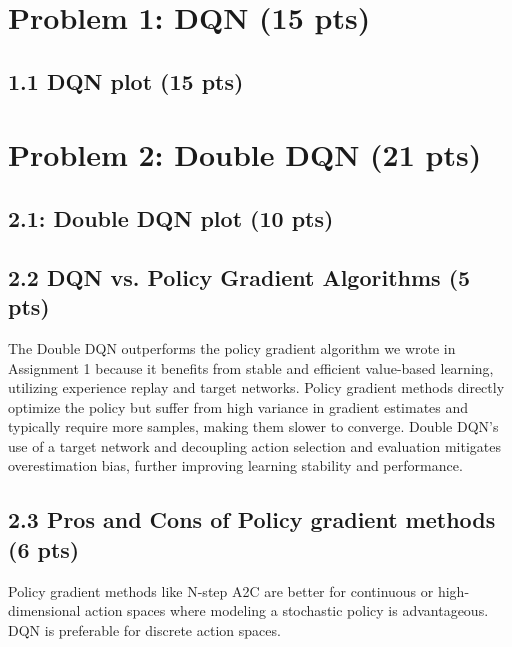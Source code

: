 \documentclass[12pt]{article}
\begin{document}
\section*{Problem 1: DQN (15 pts)}

\subsection*{1.1 DQN plot (15 pts)}
\begin{solution}[height=9cm]
\end{solution}


\newpage
\section*{Problem 2: Double DQN (21 pts)}

\subsection*{2.1: Double DQN plot (10 pts)}
\begin{solution}[height=9cm]
\end{solution}

\subsection*{2.2 DQN vs. Policy Gradient Algorithms (5 pts)}
\begin{solution}[height=8cm]
The Double DQN outperforms the policy gradient algorithm we wrote in Assignment 1 because it benefits from stable and efficient value-based learning, utilizing experience replay and target networks. Policy gradient methods directly optimize the policy but suffer from high variance in gradient estimates and typically require more samples, making them slower to converge. Double DQN’s use of a target network and decoupling action selection and evaluation mitigates overestimation bias, further improving learning stability and performance.
\end{solution}

\subsection*{2.3 Pros and Cons of Policy gradient methods (6 pts)}
\begin{solution}[height=8cm]
Policy gradient methods like N-step A2C are better for continuous or high-dimensional action spaces where modeling a stochastic policy is advantageous. DQN is preferable for discrete action spaces. 
\end{solution}
\end{document}
